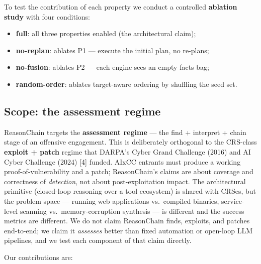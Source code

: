 \documentclass[
]{article}
\providecommand{\tightlist}{%
  \setlength{\itemsep}{0pt}\setlength{\parskip}{0pt}}
\begin{document}
To test the contribution of each property we conduct a controlled
\textbf{ablation study} with four conditions:

\begin{itemize}
\tightlist
\item
  \textbf{full}: all three properties enabled (the architectural claim);
\item
  \textbf{no-replan}: ablates P1 --- execute the initial plan, no
  re-plans;
\item
  \textbf{no-fusion}: ablates P2 --- each engine sees an empty facts
  bag;
\item
  \textbf{random-order}: ablates target-aware ordering by shuffling the
  seed set.
\end{itemize}

\subsection{Scope: the assessment
regime}\label{scope-the-assessment-regime}

ReasonChain targets the \textbf{assessment regime} --- the find +
interpret + chain stage of an offensive engagement. This is deliberately
orthogonal to the CRS-class \textbf{exploit + patch} regime that DARPA's
Cyber Grand Challenge (2016) and AI Cyber Challenge (2024) {[}4{]}
funded. AIxCC entrants must produce a working proof-of-vulnerability and
a patch; ReasonChain's claims are about coverage and correctness of
\emph{detection}, not about post-exploitation impact. The architectural
primitive (closed-loop reasoning over a tool ecosystem) is shared with
CRSes, but the problem space --- running web applications vs.~compiled
binaries, service-level scanning vs.~memory-corruption synthesis --- is
different and the success metrics are different. We do not claim
ReasonChain finds, exploits, and patches end-to-end; we claim it
\emph{assesses} better than fixed automation or open-loop LLM pipelines,
and we test each component of that claim directly.

Our contributions are:
\end{document}
